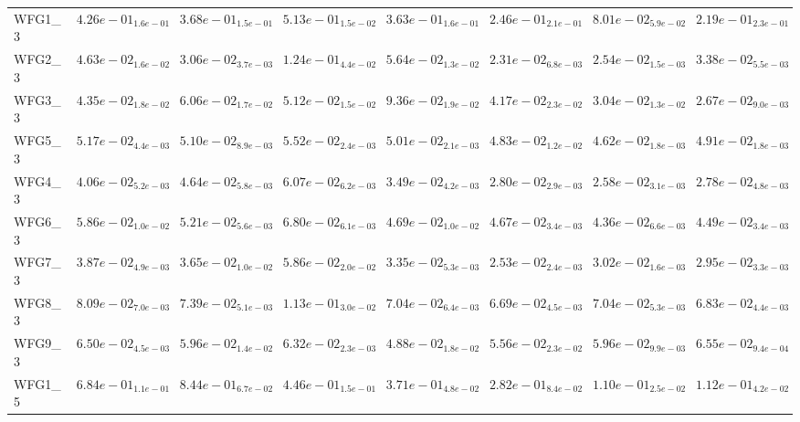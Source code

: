 \documentclass{article}
\begin{document}
\begin{table}
\begin{scriptsize}
\begin{tabular}{llllllll}
WFG1\_3 & $  4.26e-01_{ 1.6e-01}$ & $  3.68e-01_{ 1.5e-01}$ & $  5.13e-01_{ 1.5e-02}$ & $  3.63e-01_{ 1.6e-01}$ & $  2.46e-01_{ 2.1e-01}$ & \cellcolor{gray95}$  8.01e-02_{ 5.9e-02}$ & \cellcolor{gray25}$  2.19e-01_{ 2.3e-01}$ \\
WFG2\_3 & $  4.63e-02_{ 1.6e-02}$ & $  3.06e-02_{ 3.7e-03}$ & $  1.24e-01_{ 4.4e-02}$ & $  5.64e-02_{ 1.3e-02}$ & \cellcolor{gray95}$  2.31e-02_{ 6.8e-03}$ & \cellcolor{gray25}$  2.54e-02_{ 1.5e-03}$ & $  3.38e-02_{ 5.5e-03}$ \\
WFG3\_3 & $  4.35e-02_{ 1.8e-02}$ & $  6.06e-02_{ 1.7e-02}$ & $  5.12e-02_{ 1.5e-02}$ & $  9.36e-02_{ 1.9e-02}$ & $  4.17e-02_{ 2.3e-02}$ & \cellcolor{gray25}$  3.04e-02_{ 1.3e-02}$ & \cellcolor{gray95}$  2.67e-02_{ 9.0e-03}$ \\
WFG5\_3 & $  5.17e-02_{ 4.4e-03}$ & $  5.10e-02_{ 8.9e-03}$ & $  5.52e-02_{ 2.4e-03}$ & $  5.01e-02_{ 2.1e-03}$ & \cellcolor{gray25}$  4.83e-02_{ 1.2e-02}$ & \cellcolor{gray95}$  4.62e-02_{ 1.8e-03}$ & $  4.91e-02_{ 1.8e-03}$ \\
WFG4\_3 & $  4.06e-02_{ 5.2e-03}$ & $  4.64e-02_{ 5.8e-03}$ & $  6.07e-02_{ 6.2e-03}$ & $  3.49e-02_{ 4.2e-03}$ & $  2.80e-02_{ 2.9e-03}$ & \cellcolor{gray95}$  2.58e-02_{ 3.1e-03}$ & \cellcolor{gray25}$  2.78e-02_{ 4.8e-03}$ \\
WFG6\_3 & $  5.86e-02_{ 1.0e-02}$ & $  5.21e-02_{ 5.6e-03}$ & $  6.80e-02_{ 6.1e-03}$ & $  4.69e-02_{ 1.0e-02}$ & $  4.67e-02_{ 3.4e-03}$ & \cellcolor{gray95}$  4.36e-02_{ 6.6e-03}$ & \cellcolor{gray25}$  4.49e-02_{ 3.4e-03}$ \\
WFG7\_3 & $  3.87e-02_{ 4.9e-03}$ & $  3.65e-02_{ 1.0e-02}$ & $  5.86e-02_{ 2.0e-02}$ & $  3.35e-02_{ 5.3e-03}$ & \cellcolor{gray95}$  2.53e-02_{ 2.4e-03}$ & $  3.02e-02_{ 1.6e-03}$ & \cellcolor{gray25}$  2.95e-02_{ 3.3e-03}$ \\
WFG8\_3 & $  8.09e-02_{ 7.0e-03}$ & $  7.39e-02_{ 5.1e-03}$ & $  1.13e-01_{ 3.0e-02}$ & $  7.04e-02_{ 6.4e-03}$ & \cellcolor{gray95}$  6.69e-02_{ 4.5e-03}$ & $  7.04e-02_{ 5.3e-03}$ & \cellcolor{gray25}$  6.83e-02_{ 4.4e-03}$ \\
WFG9\_3 & $  6.50e-02_{ 4.5e-03}$ & $  5.96e-02_{ 1.4e-02}$ & $  6.32e-02_{ 2.3e-03}$ & \cellcolor{gray95}$  4.88e-02_{ 1.8e-02}$ & \cellcolor{gray25}$  5.56e-02_{ 2.3e-02}$ & $  5.96e-02_{ 9.9e-03}$ & $  6.55e-02_{ 9.4e-04}$ \\
WFG1\_5 & $  6.84e-01_{ 1.1e-01}$ & $  8.44e-01_{ 6.7e-02}$ & $  4.46e-01_{ 1.5e-01}$ & $  3.71e-01_{ 4.8e-02}$ & $  2.82e-01_{ 8.4e-02}$ & \cellcolor{gray95}$  1.10e-01_{ 2.5e-02}$ & \cellcolor{gray25}$  1.12e-01_{ 4.2e-02}$ \\

\end{tabular}
\end{scriptsize}
\end{table}
\end{document}
